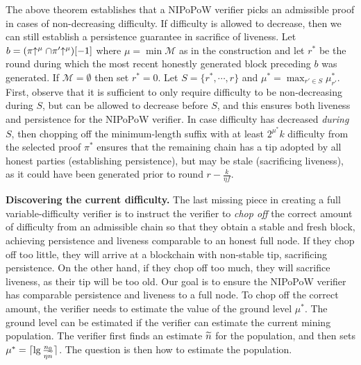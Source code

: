 \begin{remark}
  The above theorem establishes that a NIPoPoW verifier picks an admissible
  proof in cases of non-decreasing difficulty. If difficulty is allowed to
  decrease, then we can still establish a persistence guarantee in sacrifice of
  liveness. Let $b = (\pi\negthickspace\uparrow^\mu\cap\pi'\negthickspace\uparrow^\mu)[-1]$ where $\mu =
  \min{\mathcal{M}}$ as in the construction and let $r^*$ be the round
  during which the most recent honestly generated block preceding $b$ was
  generated.
  If $\mathcal{M} = \emptyset$ then set $r^* = 0$.
  Let $S = \{r^*, \cdots, r\}$
  and $\mu^* = \max_{r' \in S} \mu^*_{r'}$. First, observe
  that it is sufficient to only require difficulty to be non-decreasing during
  $S$, but can be allowed to decrease before $S$, and this ensures both liveness
  and persistence for the NIPoPoW verifier. In case difficulty has decreased
  \emph{during} $S$, then chopping off the minimum-length suffix with at least
  $2^{\mu^*}k$ difficulty from the selected proof $\pi^*$ ensures that the
  remaining chain has a tip adopted by all honest parties (establishing
  persistence), but may be stale (sacrificing liveness), as it could have been
  generated prior to round $r - \frac{k}{\eta f}$.
\end{remark}

\noindent
\textbf{Discovering the current difficulty.}
The last missing piece in creating a full variable-difficulty verifier is to
instruct the verifier to \emph{chop off} the correct amount of difficulty from
an admissible chain so that they obtain a stable and fresh block, achieving
persistence and liveness comparable to an honest full node. If they chop off too
little, they will arrive at a blockchain with non-stable tip, sacrificing
persistence. On the other hand, if they chop off too much, they will sacrifice
liveness, as their tip will be too old. Our goal is to ensure the NIPoPoW
verifier has comparable persistence and liveness to a full node. To chop off the
correct amount, the verifier needs to estimate the value of the ground level
$\mu^*$. The ground level can be estimated if the verifier can estimate the
current mining population. The verifier first finds an estimate $\widetilde{n}$ for
the population, and then sets $\mu^* = \lceil\lg\frac{n_0}{\eta\widetilde{n}}\rceil$.
The question is then how to estimate the population.

